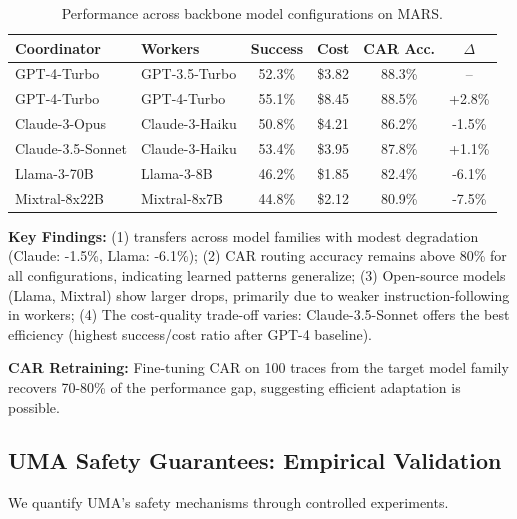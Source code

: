 \documentclass{article}
\theoremstyle{plain}
\theoremstyle{definition}
\theoremstyle{remark}
\begin{document}
\begin{table}[h]
	\caption{Performance across backbone model configurations on MARS.}
	\label{tab:backbone_robustness}
	\centering
	\small
	\begin{tabular}{@{}llcccc@{}}
		\toprule
		\textbf{Coordinator} & \textbf{Workers} & \textbf{Success} & \textbf{Cost} & \textbf{CAR Acc.} & \textbf{$\Delta$} \\
		\midrule
		GPT-4-Turbo & GPT-3.5-Turbo & 52.3\% & \$3.82 & 88.3\% & -- \\
		GPT-4-Turbo & GPT-4-Turbo & 55.1\% & \$8.45 & 88.5\% & +2.8\% \\
		Claude-3-Opus & Claude-3-Haiku & 50.8\% & \$4.21 & 86.2\% & -1.5\% \\
		Claude-3.5-Sonnet & Claude-3-Haiku & 53.4\% & \$3.95 & 87.8\% & +1.1\% \\
		Llama-3-70B & Llama-3-8B & 46.2\% & \$1.85 & 82.4\% & -6.1\% \\
		Mixtral-8x22B & Mixtral-8x7B & 44.8\% & \$2.12 & 80.9\% & -7.5\% \\
		\bottomrule
	\end{tabular}
\end{table}

\textbf{Key Findings:} (1) \amore{} transfers across model families with modest degradation (Claude: -1.5\%, Llama: -6.1\%); (2) CAR routing accuracy remains above 80\% for all configurations, indicating learned patterns generalize; (3) Open-source models (Llama, Mixtral) show larger drops, primarily due to weaker instruction-following in workers; (4) The cost-quality trade-off varies: Claude-3.5-Sonnet offers the best efficiency (highest success/cost ratio after GPT-4 baseline).

\textbf{CAR Retraining:} Fine-tuning CAR on 100 traces from the target model family recovers 70-80\% of the performance gap, suggesting efficient adaptation is possible.

\subsection{UMA Safety Guarantees: Empirical Validation}
\label{sec:uma_safety}

We quantify UMA's safety mechanisms through controlled experiments.
\end{document}
